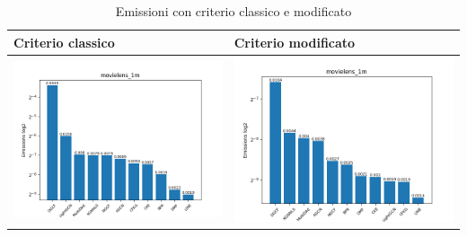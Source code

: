 \begin{table}[H]
    \centering
    \footnotesize
    \setlength\tabcolsep{0pt}
    \begin{tabularx}{\textwidth}{|X|X|}
        \hline
        \textbf{Criterio classico} & \textbf{Criterio modificato} \\
        \hline
        \includegraphics[width=\linewidth, trim=0 0 0 0]{images/emissions_movielens_1m_30_5_earlyClassic.png} &
        \includegraphics[width=\linewidth, trim=0 0 0 0]{images/emissions_movielens_1m_30_5_earlyModified.png} \\
        \hline
    \end{tabularx}
    \caption{Emissioni con criterio classico e modificato}
    \label{tab:emissions_info}
\end{table}



